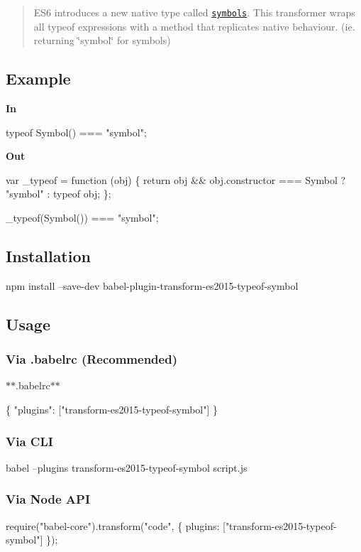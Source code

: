 \begin{quote}
E\+S6 introduces a new native type called \href{https://babeljs.io/learn-es2015/#ecmascript-2015-features-symbols}{\tt symbols}. This transformer wraps all {\ttfamily typeof} expressions with a method that replicates native behaviour. (ie. returning \char`\"{}symbol\char`\"{} for symbols) \end{quote}


\subsection*{Example}

{\bfseries In}


\begin{DoxyCode}
typeof Symbol() === "symbol";
\end{DoxyCode}


{\bfseries Out}


\begin{DoxyCode}
var \_typeof = function (obj) \{
  return obj && obj.constructor === Symbol ? "symbol" : typeof obj;
\};

\_typeof(Symbol()) === "symbol";
\end{DoxyCode}


\subsection*{Installation}


\begin{DoxyCode}
npm install --save-dev babel-plugin-transform-es2015-typeof-symbol
\end{DoxyCode}


\subsection*{Usage}

\subsubsection*{Via {\ttfamily .babelrc} (Recommended)}

$\ast$$\ast$.babelrc$\ast$$\ast$


\begin{DoxyCode}
\{
  "plugins": ["transform-es2015-typeof-symbol"]
\}
\end{DoxyCode}


\subsubsection*{Via C\+LI}


\begin{DoxyCode}
babel --plugins transform-es2015-typeof-symbol script.js
\end{DoxyCode}


\subsubsection*{Via Node A\+PI}


\begin{DoxyCode}
require("babel-core").transform("code", \{
  plugins: ["transform-es2015-typeof-symbol"]
\});
\end{DoxyCode}
 